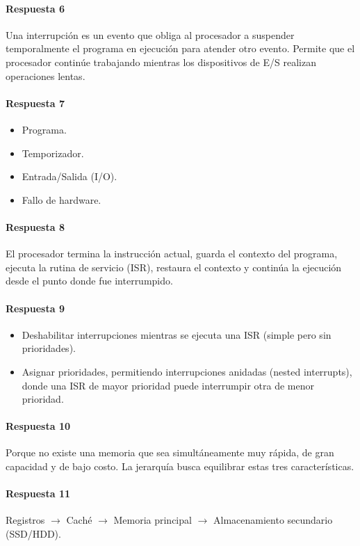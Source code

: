 \paragraph{Respuesta 6} Una interrupción es un evento que obliga al procesador a suspender temporalmente el programa en ejecución para atender otro evento. Permite que el procesador continúe trabajando mientras los dispositivos de E/S realizan operaciones lentas.

\paragraph{Respuesta 7}
\begin{itemize}
  \item Programa.
  \item Temporizador.
  \item Entrada/Salida (I/O).
  \item Fallo de hardware.
\end{itemize}

\paragraph{Respuesta 8} El procesador termina la instrucción actual, guarda el contexto del programa, ejecuta la rutina de servicio (ISR), restaura el contexto y continúa la ejecución desde el punto donde fue interrumpido.

\paragraph{Respuesta 9}
\begin{itemize}
  \item Deshabilitar interrupciones mientras se ejecuta una ISR (simple pero sin prioridades).
  \item Asignar prioridades, permitiendo interrupciones anidadas (nested interrupts), donde una ISR de mayor prioridad puede interrumpir otra de menor prioridad.
\end{itemize}

\paragraph{Respuesta 10} Porque no existe una memoria que sea simultáneamente muy rápida, de gran capacidad y de bajo costo. La jerarquía busca equilibrar estas tres características.

\paragraph{Respuesta 11} Registros \(\to\) Caché \(\to\) Memoria principal \(\to\) Almacenamiento secundario (SSD/HDD).

